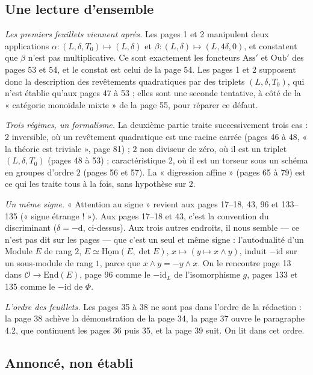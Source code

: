 \documentclass[11pt,a4paper]{article}
\begin{document}
\subsection*{Une lecture d'ensemble}

\emph{Les premiers feuillets viennent après.} Les pages 1 et 2 manipulent deux
applications $\alpha : (L, \delta, T_0) \mapsto (L, \delta)$ et
$\beta : (L, \delta) \mapsto (L, 4\delta, 0)$, et constatent que $\beta$ n'est pas
multiplicative. Ce sont exactement les foncteurs $\mathrm{Ass}'$ et
$\mathrm{Oub}'$ des pages 53 et 54, et le constat est celui de la page 54. Les
pages 1 et 2 supposent donc la description des revêtements quadratiques par des
triplets $(L, \delta, T_0)$, qui n'est établie qu'aux pages 47 à 53 ; elles sont
une seconde tentative, à côté de la « catégorie monoïdale mixte » de la page 55,
pour réparer ce défaut.

\emph{Trois régimes, un formalisme.} La deuxième partie traite successivement
trois cas : $2$ inversible, où un revêtement quadratique est une racine carrée
(pages 46 à 48, « la théorie est triviale », page 81) ; $2$ non diviseur de zéro,
où il est un triplet $(L, \delta, T_0)$ (pages 48 à 53) ; caractéristique $2$, où
il est un torseur sous un schéma en groupes d'ordre $2$ (pages 56 et 57). La
« digression affine » (pages 65 à 79) est ce qui les traite tous à la fois, sans
hypothèse sur $2$.

\emph{Un même signe.} « Attention au signe » revient aux pages 17--18, 43, 96 et
133--135 (« signe étrange ! »). Aux pages 17--18 et 43, c'est la convention du
discriminant ($\delta = -\mathrm{d}$, ci-dessus). Aux trois autres endroits, il
nous semble --- ce n'est pas dit sur les pages --- que c'est un seul et même
signe : l'autodualité d'un Module $E$ de rang $2$, $E \simeq
\underline{\mathrm{Hom}}(E, \det E)$, $x \mapsto (y \mapsto x \wedge y)$, induit
$-\mathrm{id}$ sur un sous-module de rang $1$, parce que $x \wedge y = -y \wedge x$. On
le rencontre page 13 dans $\mathcal{O} \to \underline{\mathrm{End}}(E)$, page 96
comme le $-\mathrm{id}_L$ de l'isomorphisme $g$, pages 133 et 135 comme le
$-\mathrm{id}$ de $\Phi$.

\emph{L'ordre des feuillets.} Les pages 35 à 38 ne sont pas dans l'ordre de la
rédaction : la page 38 achève la démonstration de la page 34, la page 37 ouvre
le paragraphe 4.2, que continuent les pages 36 puis 35, et la page 39 suit. On
lit dans cet ordre.

\subsection*{Annoncé, non établi}
\end{document}
